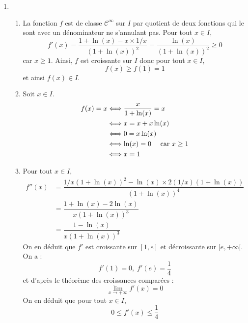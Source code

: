 \documentclass[a4paper,twoside,french,11pt]{VcCours}
\begin{document}
 
%

%

\begin{Exercice}{}\end{Exercice}

\begin{enumerate}
\item
\begin{enumerate}
\item La fonction $f$ est de classe $\mathcal{C}^{\infty}$ sur $I$ par quotient de deux fonctions qui le sont avec un dénominateur ne s'annulant pas. Pour tout $x \in I$,
$$ f'(x) = \dfrac{1+\ln(x)- x \times 1/x}{(1+ \ln(x))^2} = \dfrac{\ln(x)}{(1+\ln(x))^2} \geq 0$$
car $x \geq 1$. Ainsi, $f$ est croissante sur $I$ donc pour tout $x \in I$,
$$ f(x) \geq f(1) = 1$$
et ainsi $f(x) \in I$.
\item Soit $x \in I$.
\begin{align*}
f(x)=x & \Longleftrightarrow \dfrac{x}{1+\ln(x)} = x \\
& \Longleftrightarrow x = x + x \ln(x) \\
& \Longleftrightarrow 0 = x \ln(x) \\
& \Longleftrightarrow \ln(x)=0 \quad \hbox{ car } x \geq 1 \\
& \Longleftrightarrow x = 1 
\end{align*}
\item Pour tout $x \in I$,
\begin{align*}
f''(x) & = \dfrac{1/x (1+\ln(x))^2 - \ln(x) \times 2 (1/x) (1+\ln(x))}{(1+\ln(x))^4} \\
& = \dfrac{1+\ln(x)-2 \ln(x)}{x (1+\ln(x))^3}\\
& = \dfrac{1-\ln(x)}{x (1+\ln(x))^3}
\end{align*}
On en déduit que $f'$ est croissante sur $[1,e]$ et décroissante sur $[e, + \infty[$. On a :
$$ f'(1) = 0, \; f'(e) = \dfrac{1}{4}$$
et d'après le théorème des croissances comparées :
$$ \lim_{x \rightarrow + \infty} f'(x) = 0$$
On en déduit que pour tout $x \in I$,
$$ 0 \leq f'(x) \leq \dfrac{1}{4}$$


\end{enumerate}
\end{enumerate}
\end{document}
